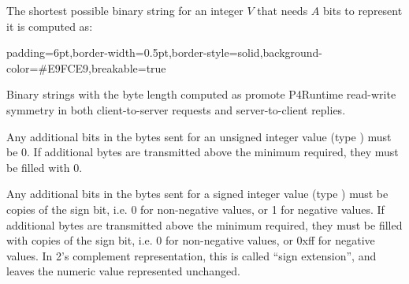 \documentclass[11pt]{article}
\begin{document}
{%
The shortest possible binary string for an integer $V$ that needs $A$ bits to
represent it is computed as:%

\begin{mdbmargintb}{6pt}{6pt}%
\begin{mdblock}{padding=6pt,border-width=0.5pt,border-style=solid,background-color=\#E9FCE9,breakable=true}%
\begin{mdpre}%
\end{mdpre}%
\end{mdblock}%
\end{mdbmargintb}%

\noindent{}Binary strings with the byte length computed as  promote
P4Runtime read-write symmetry in both client-to-server requests and
server-to-client replies.%

Any additional bits in the bytes sent for an unsigned integer value (type
) must be 0.  If additional bytes are transmitted above the
 minimum required, they must be filled with 0.%

Any additional bits in the bytes sent for a signed integer value (type )
must be copies of the sign bit, i.e. 0 for non-negative values, or 1 for
negative values. If additional bytes are transmitted above the
 minimum required, they must be filled with copies of the
sign bit, i.e. 0 for non-negative values, or 0xff for negative values. In 2's
complement representation, this is called \textquotedblleft{}sign extension\textquotedblright{}, and leaves the
numeric value represented unchanged.%

}
\end{document}
